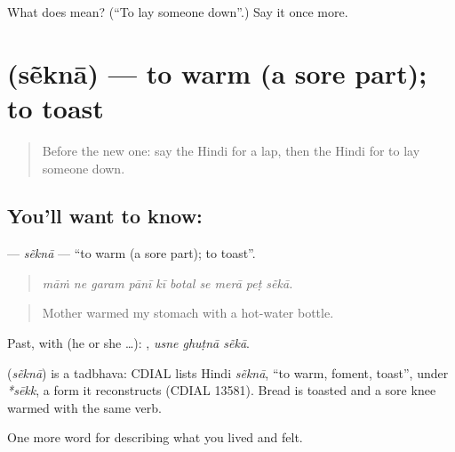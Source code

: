 \begin{tcolorbox}[breakable,colback=teal!4,colframe=teal!35!black,title={Before you move on}]
What does  mean? (\textquotedblleft{}To lay someone down\textquotedblright{}.) Say it once more.
\end{tcolorbox}
\section[\texorpdfstring{\hi{सेंकना} (sẽknā)}{सेंकना (sẽknā)}]{ (sẽknā) — to warm (a sore part); to toast}

\label{lesson:HI-C494-sekna}



\begin{quote}
Before the new one: say the Hindi for a lap, then the Hindi for to lay someone down.
\end{quote}

\subsection*{You'll want to know: }
\textbf{} — \emph{sẽknā} — \textquotedblleft{}to warm (a sore part); to toast\textquotedblright{}.

\begin{quote}
         
\end{quote}

\begin{quote}
\emph{māṁ ne garam pānī kī botal se merā peṭ sẽkā.}
\end{quote}

\begin{quote}
Mother warmed my stomach with a hot-water bottle.
\end{quote}

Past, with  (he or she …):   , \emph{usne ghuṭnā sẽkā}.

\begin{cousinweb}
\textbf{} (\emph{sẽknā}) is a tadbhava: CDIAL lists Hindi \emph{sẽknā}, \textquotedblleft{}to warm, foment, toast\textquotedblright{}, under \emph{*sēkk}, a form it reconstructs (CDIAL 13581). Bread is toasted and a sore knee warmed with the same verb.
\end{cousinweb}

\begin{grammarlens}[title={What you've built}]
One more word for describing what you lived and felt.
\end{grammarlens}

